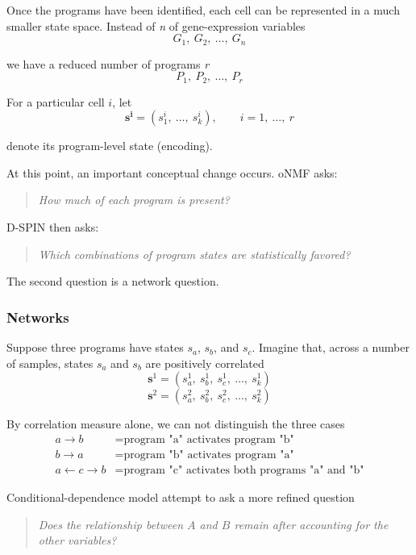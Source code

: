 \documentclass[11pt,a4paper]{article}
\begin{document}
Once the programs have been identified, each cell can be represented in a much smaller state space. Instead of \textit{n} of gene-expression variables
\[
G_1,~G_2,~\ldots,~G_n
\]

we have a reduced number of programs \textit{r}
\[
P_1,~P_2,~\ldots,~P_r
\]

For a particular cell $i$, let
\[
\bm{s^i}
=
(s_1^{i},~\ldots,~s_k^{i}), \qquad i = 1,~\dots,~r
\]

denote its program-level state (encoding).

At this point, an important conceptual change occurs. oNMF asks:

\begin{quote}
	\textit{How much of each program is present?}
\end{quote}

D-SPIN then asks:

\begin{quote}
	\textit{Which combinations of program states are statistically favored?}
\end{quote}

The second question is a network question. 

\subsubsection{Networks}

Suppose three programs have states $s_a$, $s_b$, and $s_c$. Imagine that, across a number of samples, states $s_a$ and $s_b$ are positively correlated
\[
\bm{s}^{1}
=
(s_a^{1},~s_b^{1},~s_c^{1},~\ldots,~s_k^{1})
\]
\[
\bm{s}^{2}
=
(s_a^{2},~s_b^{2},~s_c^{2},~\ldots,~s_k^{2})
\]

By correlation measure alone, we can not distinguish the three cases
\begin{align*}
a \rightarrow b &= \text{program "a" activates program "b"} \\
b \rightarrow a &= \text{program "b" activates program "a"} \\
a \leftarrow c \rightarrow b &= \text{program "c" activates both programs "a" and "b"} 
\end{align*}

Conditional-dependence model attempt to ask a more refined question
\begin{quote}
\textit{Does the relationship between $A$ and $B$ remain after accounting for	the other variables?}
\end{quote}

\end{document}

